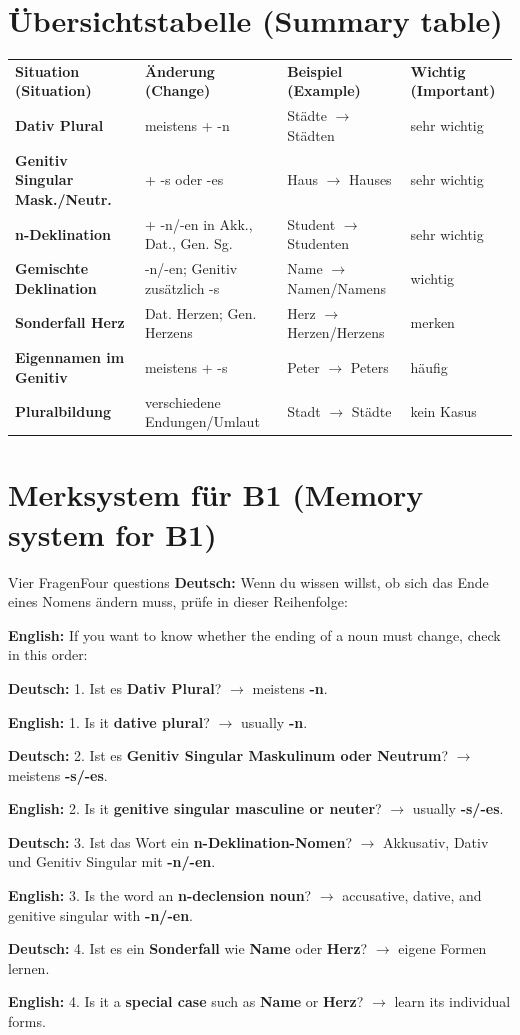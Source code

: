\documentclass[a4paper,11pt]{article}
\newcommand{\GermanText}[1]{\textbf{Deutsch: }#1\par}
\newcommand{\EnglishText}[1]{{\small\color{SoftGray}\textbf{English: }#1\par}}
\begin{document}
\section{Übersichtstabelle \textnormal{(Summary table)}}

\begin{longtable}{>{\bfseries}p{3.3cm}|p{4.0cm}|p{4.0cm}|p{3.0cm}}
\rowcolor{HeaderBlueDark}
\color{white}\textbf{Situation (Situation)} &
\color{white}\textbf{Änderung (Change)} &
\color{white}\textbf{Beispiel (Example)} &
\color{white}\textbf{Wichtig (Important)} \\
Dativ Plural & meistens + -n & Städte $\rightarrow$ Städten & sehr wichtig \\
Genitiv Singular Mask./Neutr. & + -s oder -es & Haus $\rightarrow$ Hauses & sehr wichtig \\
n-Deklination & + -n/-en in Akk., Dat., Gen. Sg. & Student $\rightarrow$ Studenten & sehr wichtig \\
Gemischte Deklination & -n/-en; Genitiv zusätzlich -s & Name $\rightarrow$ Namen/Namens & wichtig \\
Sonderfall Herz & Dat. Herzen; Gen. Herzens & Herz $\rightarrow$ Herzen/Herzens & merken \\
Eigennamen im Genitiv & meistens + -s & Peter $\rightarrow$ Peters & häufig \\
Pluralbildung & verschiedene Endungen/Umlaut & Stadt $\rightarrow$ Städte & kein Kasus \\
\end{longtable}


\section{Merksystem für B1 \textnormal{(Memory system for B1)}}

\begin{grammarentry}{Vier Fragen}{Four questions}
\GermanText{Wenn du wissen willst, ob sich das Ende eines Nomens ändern muss, prüfe in dieser Reihenfolge:}
\EnglishText{If you want to know whether the ending of a noun must change, check in this order:}

\GermanText{1. Ist es \textbf{Dativ Plural}? $\rightarrow$ meistens \textbf{-n}.}
\EnglishText{1. Is it \textbf{dative plural}? $\rightarrow$ usually \textbf{-n}.}

\GermanText{2. Ist es \textbf{Genitiv Singular Maskulinum oder Neutrum}? $\rightarrow$ meistens \textbf{-s/-es}.}
\EnglishText{2. Is it \textbf{genitive singular masculine or neuter}? $\rightarrow$ usually \textbf{-s/-es}.}

\GermanText{3. Ist das Wort ein \textbf{n-Deklination-Nomen}? $\rightarrow$ Akkusativ, Dativ und Genitiv Singular mit \textbf{-n/-en}.}
\EnglishText{3. Is the word an \textbf{n-declension noun}? $\rightarrow$ accusative, dative, and genitive singular with \textbf{-n/-en}.}

\GermanText{4. Ist es ein \textbf{Sonderfall} wie \textbf{Name} oder \textbf{Herz}? $\rightarrow$ eigene Formen lernen.}
\EnglishText{4. Is it a \textbf{special case} such as \textbf{Name} or \textbf{Herz}? $\rightarrow$ learn its individual forms.}
\end{grammarentry}
\end{document}
